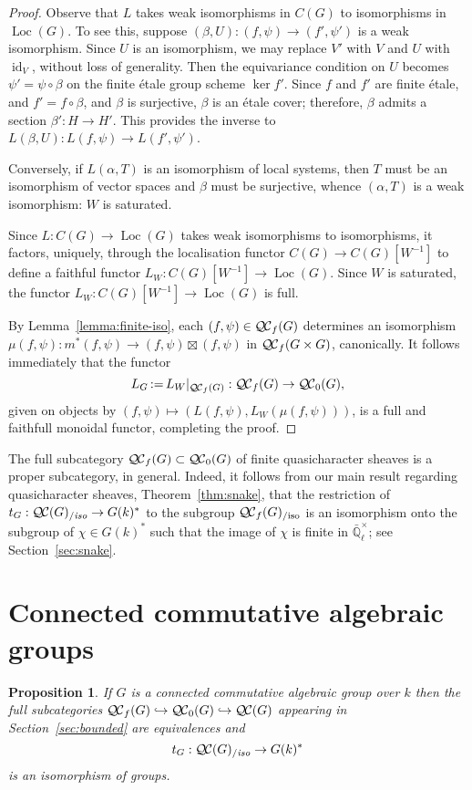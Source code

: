 \documentclass[11pt]{amsart}
\theoremstyle{plain}
\newtheorem{proposition}[theorem]{Proposition}
\theoremstyle{definition}
\theoremstyle{remark}
\newcommand{\EE}{\mathbb{\bar Q}_\ell}
\newcommand{\Fq}{k}
\newcommand{\EEx}{\EE^\times}
\DeclareMathOperator{\id}{id}
\newcommand{\ceq}{{\, :=\, }}
\newcommand{\QC}{{\mathcal{Q\hskip-0.8pt C}}}
\newcommand{\QCb}{{\QC_0}}
\newcommand{\QCf}{{\QC_f}}
\newcommand{\QCiso}[1]{\QC(#1)_{/\textit{iso}}}
\newcommand{\QCfiso}[1]{\QCf(#1)_{/\text{iso}}}
\newcommand{\Loc}{{\operatorname{Loc}}}
\newcommand{\trFrob}[1]{t_{#1}}
\begin{document}
\begin{proof}
 Observe that $L$ takes weak isomorphisms in $C(G)$ to isomorphisms in $\Loc(G)$. 
 To see this, suppose $(\beta,U) : (f,\psi)\to (f',\psi')$ is a weak isomorphism. 
 Since $U$ is an isomorphism, we may replace $V'$ with $V$ and $U$ with $\id_V$, without loss of generality. 
 Then the equivariance condition on $U$ becomes $\psi' = \psi\circ \beta$ on the finite \'etale group scheme $\ker f'$. 
 Since $f$ and $f'$ are finite \'etale, and $f' = f\circ \beta$, and $\beta$ is surjective,
 $\beta$ is an \'etale cover; therefore, $\beta$ admits a section $\beta' : H \to H'$.
 This provides the inverse to $L(\beta,U) : L(f,\psi) \to L(f',\psi')$.
 
 Conversely, if $L(\alpha,T)$ is an isomorphism of local systems, 
 then $T$ must be an isomorphism of vector spaces and $\beta$ must be surjective,
 whence $(\alpha,T)$ is a weak isomorphism: $W$ is saturated.
  
 Since $L : C(G) \to \Loc(G)$ takes weak isomorphisms to isomorphisms,
 it factors, uniquely, through the localisation functor $C(G) \to C(G)[W^{-1}]$ 
 to define a faithful functor $L_{W} : C(G)[W^{-1}] \to \Loc(G)$. 
 Since $W$ is saturated, the functor $L_{W} : C(G)[W^{-1}] \to \Loc(G)$ is full. 
   
 By Lemma~\ref{lemma:finite-iso}, each $(f,\psi) \in \QCf(G)$ determines 
 an isomorphism $\mu(f,\psi) : m^*(f,\psi) \to (f,\psi) \boxtimes (f,\psi)$ in $\QCf(G\times G)$, canonically.
 It follows immediately that the functor 
 \[
 L_G  \ceq  L_{W}\vert_{\QCf(G)} : \QCf(G) \to \QCb(G),
 \] 
 given on objects by $(f,\psi) \mapsto (L(f,\psi), L_{W}(\mu(f,\psi)))$,
 is a full and faithfull monoidal functor, completing the proof.
\end{proof}


The full subcategory $\QCf(G) \subset \QCb(G)$ of finite quasicharacter sheaves
is a proper subcategory, in general. Indeed, it follows from our main result regarding
quasicharacter sheaves, Theorem~\ref{thm:snake}, that the restriction of
$\trFrob{G} : \QCiso{G} \to G(\Fq)^*$ to the subgroup $\QCfiso{G}$ is an isomorphism
onto the subgroup of $\chi \in G(\Fq)^*$ such that the image of $\chi$ is finite in $\EEx$;
see Section~\ref{sec:snake}.
 
\section{Connected commutative algebraic groups} \label{sec:connected}

\begin{proposition}\label{prop:connected}
  If $G$ is a connected commutative algebraic group over $\Fq$ then 
  the full subcategories $\QCf(G) \hookrightarrow \QCb(G) \hookrightarrow \QC(G)$ 
  appearing in Section~\ref{sec:bounded} are equivalences 
  and
  \[
  \trFrob{G} : \QCiso{G} \to G(\Fq)^*
  \]
  is an isomorphism of groups.
\end{proposition}
\end{document}
